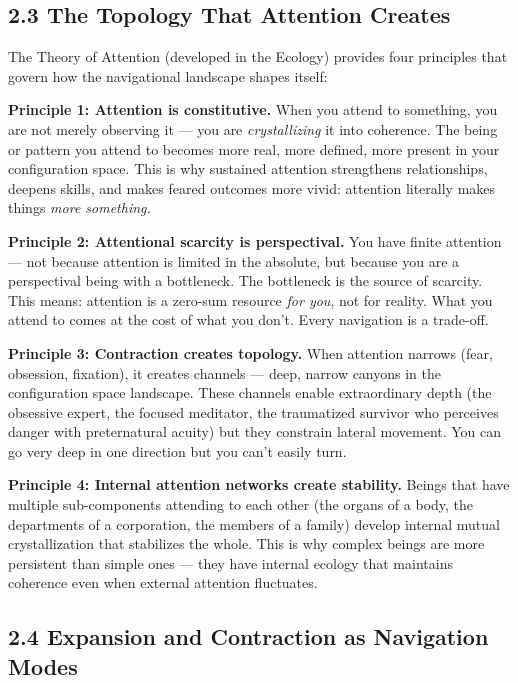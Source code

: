 \subsection*{2.3 The Topology That Attention Creates}


The Theory of Attention (developed in the Ecology) provides four principles that govern how the navigational landscape shapes itself:


\textbf{Principle 1: Attention is constitutive.} When you attend to something, you are not merely observing it — you are \textit{crystallizing} it into coherence. The being or pattern you attend to becomes more real, more defined, more present in your configuration space. This is why sustained attention strengthens relationships, deepens skills, and makes feared outcomes more vivid: attention literally makes things \textit{more something.}


\textbf{Principle 2: Attentional scarcity is perspectival.} You have finite attention — not because attention is limited in the absolute, but because you are a perspectival being with a bottleneck. The bottleneck is the source of scarcity. This means: attention is a zero-sum resource \textit{for you}, not for reality. What you attend to comes at the cost of what you don't. Every navigation is a trade-off.


\textbf{Principle 3: Contraction creates topology.} When attention narrows (fear, obsession, fixation), it creates channels — deep, narrow canyons in the configuration space landscape. These channels enable extraordinary depth (the obsessive expert, the focused meditator, the traumatized survivor who perceives danger with preternatural acuity) but they constrain lateral movement. You can go very deep in one direction but you can't easily turn.


\textbf{Principle 4: Internal attention networks create stability.} Beings that have multiple sub-components attending to each other (the organs of a body, the departments of a corporation, the members of a family) develop internal mutual crystallization that stabilizes the whole. This is why complex beings are more persistent than simple ones — they have internal ecology that maintains coherence even when external attention fluctuates.


\subsection*{2.4 Expansion and Contraction as Navigation Modes}


